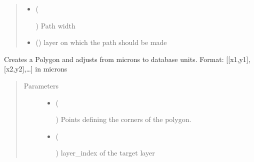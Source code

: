 \documentclass[a4paper,10pt,english]{sphinxmanual}
\begin{document}
\begin{fulllineitems}
\begin{fulllineitems}
\begin{quote}
\begin{description}
\begin{itemize}
\item {} 
 (%
\begin{footnote}[47]\sphinxAtStartFootnote
{}
%
\end{footnote}) \textendash{} Path width

\item {} 
 () \textendash{} layer on which the path should be made

\end{itemize}

\end{description}\end{quote}

\end{fulllineitems}


\begin{fulllineitems}
\label{\detokenize{photonics:photonics.PhotDevice.create_polygon}}
Creates a Polygon and adjusts from microns to database units. Format: {[}{[}x1,y1{]},{[}x2,y2{]},…{]} in microns
\begin{quote}\begin{description}
\item[{Parameters}] \leavevmode\begin{itemize}
\item {} 
 (%
\begin{footnote}[48]\sphinxAtStartFootnote
{}
%
\end{footnote}) \textendash{} Points defining the corners of the polygon.

\item {} 
 (%
\begin{footnote}[49]\sphinxAtStartFootnote
{}
%
\end{footnote}) \textendash{} layer\_index of the target layer


\end{itemize}
\end{description}
\end{quote}
\end{fulllineitems}
\end{fulllineitems}
\end{document}
